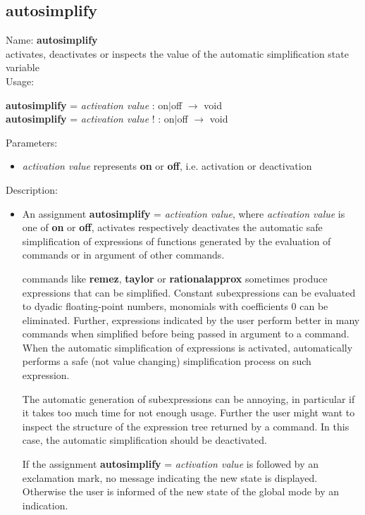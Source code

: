 \subsection{autosimplify}
\label{labautosimplify}
\noindent Name: \textbf{autosimplify}\\
activates, deactivates or inspects the value of the automatic simplification state variable\\
\noindent Usage: 
\begin{center}
\textbf{autosimplify} = \emph{activation value} : \textsf{on$|$off} $\rightarrow$ \textsf{void}
\\ 
\textbf{autosimplify} = \emph{activation value} ! : \textsf{on$|$off} $\rightarrow$ \textsf{void}
\\ 
\end{center}
Parameters: 
\begin{itemize}
\item \emph{activation value} represents \textbf{on} or \textbf{off}, i.e. activation or deactivation
\end{itemize}
\noindent Description: \begin{itemize}

\item An assignment \textbf{autosimplify} = \emph{activation value}, where \emph{activation value}
   is one of \textbf{on} or \textbf{off}, activates respectively deactivates the
   automatic safe simplification of expressions of functions generated by
   the evaluation of commands or in argument of other commands.
    
   \sollya commands like \textbf{remez}, \textbf{taylor} or \textbf{rationalapprox} sometimes
   produce expressions that can be simplified. Constant subexpressions
   can be evaluated to dyadic floating-point numbers, monomials with
   coefficients $0$ can be eliminated. Further, expressions
   indicated by the user perform better in many commands when simplified
   before being passed in argument to a command. When the automatic
   simplification of expressions is activated, \sollya automatically
   performs a safe (not value changing) simplification process on such
   expression.
    
   The automatic generation of subexpressions can be annoying, in
   particular if it takes too much time for not enough usage. Further the
   user might want to inspect the structure of the expression tree
   returned by a command. In this case, the automatic simplification
   should be deactivated.
    
   If the assignment \textbf{autosimplify} = \emph{activation value} is followed by an
   exclamation mark, no message indicating the new state is
   displayed. Otherwise the user is informed of the new state of the
   global mode by an indication.
\end{itemize}
